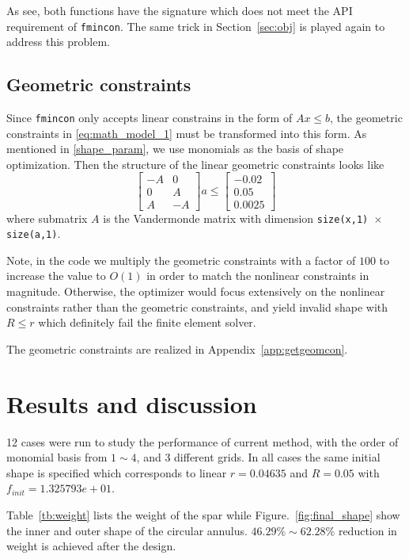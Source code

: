 \documentclass[a4paper]{article}
\begin{document}
As see, both functions have the signature which does not meet the API requirement of \texttt{fmincon}. The same trick in Section~\ref{sec:obj} is played again to address this problem. 

\subsection{Geometric constraints}
Since \texttt{fmincon} only accepts linear constrains in the form of $Ax \le b$, the geometric constraints in \eqref{eq:math_model_1} must be transformed into this form. As mentioned in \ref{shape_param}, we use monomials as the basis of shape optimization. Then the structure of the linear geometric constraints looks like 
\begin{equation*}
\begin{bmatrix}
-A & 0 \\ 0 & A \\ A & -A
\end{bmatrix} a \le \begin{bmatrix}
-0.02 \\ 0.05 \\ 0.0025
\end{bmatrix}
\end{equation*}
where submatrix $A$ is the Vandermonde matrix with dimension \texttt{size(x,1) $\times$ size(a,1)}.

Note, in the code we multiply the geometric constraints with a factor of $100$ to increase the value to $O(1)$ in order to match the nonlinear constraints in magnitude. Otherwise, the optimizer would focus extensively on the nonlinear constraints rather than the geometric constraints, and yield invalid shape with $R\le r$ which definitely fail the finite element solver.

The geometric constraints are realized in Appendix~\ref{app:getgeomcon}.

\section{Results and discussion}
12 cases were run to study the performance of current method, with the order of monomial basis from $1\sim 4$, and 3 different grids. In all cases the same initial shape is specified which corresponds to linear $r=0.04635$ and $R=0.05$ with $f_{init} = 1.325793e+01$. 

Table~\ref{tb:weight} lists the weight of the spar while Figure.~\ref{fig:final_shape} show the inner and outer shape of the circular annulus. $46.29\% \sim 62.28\%$ reduction in weight is achieved after the design.
\end{document}
